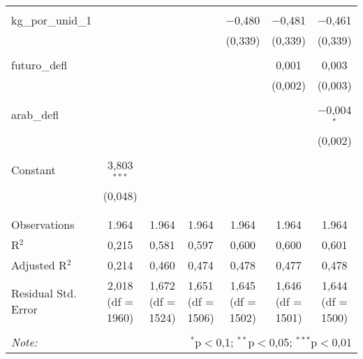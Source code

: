 \begin{table}[!htbp]
\begin{tabular}{@{\extracolsep{5pt}}lcccccc}
  & & & & & & \\ 
 kg\_por\_unid\_1 &  &  &  & $-$0,480 & $-$0,481 & $-$0,461 \\ 
  &  &  &  & (0,339) & (0,339) & (0,339) \\ 
  & & & & & & \\ 
 futuro\_defl &  &  &  &  & 0,001 & 0,003 \\ 
  &  &  &  &  & (0,002) & (0,003) \\ 
  & & & & & & \\ 
 arab\_defl &  &  &  &  &  & $-$0,004$^{*}$ \\ 
  &  &  &  &  &  & (0,002) \\ 
  & & & & & & \\ 
 Constant & 3,803$^{***}$ &  &  &  &  &  \\ 
  & (0,048) &  &  &  &  &  \\ 
  & & & & & & \\ 
\hline \\[-1.8ex] 
Observations & 1.964 & 1.964 & 1.964 & 1.964 & 1.964 & 1.964 \\ 
R$^{2}$ & 0,215 & 0,581 & 0,597 & 0,600 & 0,600 & 0,601 \\ 
Adjusted R$^{2}$ & 0,214 & 0,460 & 0,474 & 0,478 & 0,477 & 0,478 \\ 
Residual Std. Error & 2,018 (df = 1960) & 1,672 (df = 1524) & 1,651 (df = 1506) & 1,645 (df = 1502) & 1,646 (df = 1501) & 1,644 (df = 1500) \\ 
\hline 
\hline \\[-1.8ex] 
\textit{Note:}  & \multicolumn{6}{r}{$^{*}$p$<$0,1; $^{**}$p$<$0,05; $^{***}$p$<$0,01} \\ 
\end{tabular} 
\end{table} 
